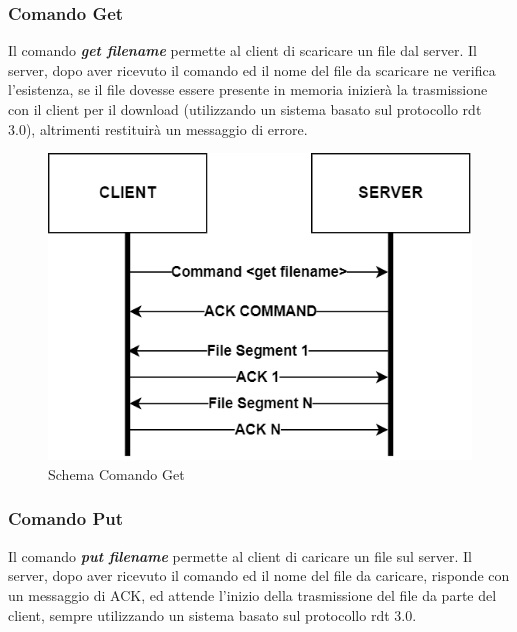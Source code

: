 \documentclass{article}
\begin{document}
\subsubsection{Comando Get}


Il comando \textbf{\emph{get filename}} permette al client di scaricare un file dal server. Il server, dopo aver ricevuto il comando ed il nome del file da scaricare
ne verifica l'esistenza, se il file dovesse essere presente in memoria inizierà la trasmissione con il client per il download (utilizzando un sistema basato sul protocollo rdt 3.0), altrimenti restituirà un messaggio di errore. 

\begin{figure}[!htb]
  \includegraphics[width=\linewidth]{commandGet.png}
  \caption{Schema Comando Get}
\end{figure}

\subsubsection{Comando Put}


Il comando \textbf{\emph{put filename}} permette al client di caricare un file sul server. Il server, dopo aver ricevuto il comando ed il nome del file da caricare, risponde con un messaggio di ACK,
ed attende l'inizio della trasmissione del file da parte del client, sempre utilizzando un sistema basato sul protocollo rdt 3.0.
\end{document}
